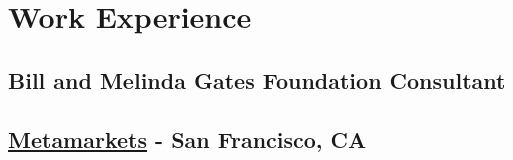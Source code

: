 \documentclass[10.5pt, sans]{moderncv}
\begin{document}
\newpage
\section{Work Experience}

  \subsection{Bill and Melinda Gates Foundation Consultant}


  \subsection{\href{http://metamarkets.com/}{Metamarkets} - San Francisco, CA}
\end{document}
